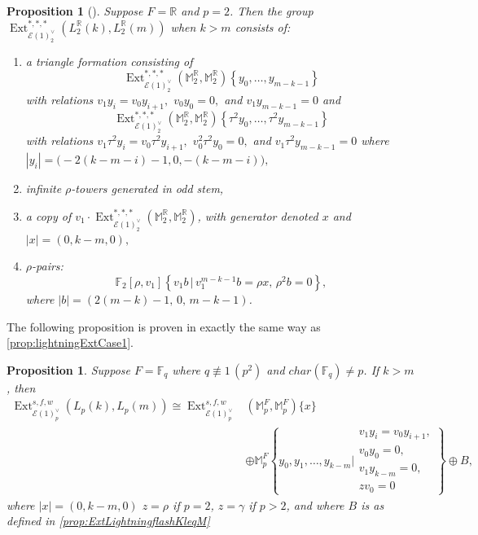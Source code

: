 \documentclass{amsart}
\newtheorem{proposition}[theorem]{Proposition}
\theoremstyle{plain}
\numberwithin{theorem}{section}
\numberwithin{equation}{section}
\numberwithin{figure}{section}
\DeclareMathOperator{\Ext}{Ext}
\newcommand{\mF}{{\mathbb F}}
\newcommand{\mM}{{\mathbb M}}
\newcommand{\mR}{{\mathbb R}}
\newcommand{\cE}{{\mathcal E}}
\newcommand{\0}{\langle 0 \rangle }
\begin{document}
\begin{proposition}[{\cite[Lemma 6.8]{LiPetTat25}}] \label{prop:RmotExtk>m}
    Suppose $F = \mR$ and $p = 2$. Then the group $\Ext_{\cE(1)_2^\vee}^{*,*,*}(L_2^\mathbb{R} (k), L_2^\mathbb{R} (m))$ when $k > m$ consists of: 
\begin{enumerate}
\item a triangle formation consisting of 
\[
\Ext^{*,*,*}_{\cE(1)_2^\vee}\left(\mM^{\mR}_{2}, \mM_2^{\mR} \right) \left\{y_{0}, \ldots, y_{m-k-1} \right\}
\]
with relations $v_{1}y_{i} = v_{0}y_{i+1},$ $v_{0}y_{0} = 0,$ and $v_{1}y_{m-k-1} = 0$ and 
\[
\Ext^{*,*,*}_{\cE(1)_2^\vee}\left(\mM_2^{\mR}, \mM_2^{\mR} \right) \left\{ \tau^{2}y_{0}, \ldots, \tau^{2}y_{m-k-1} \right\}
\]
with relations $v_{1} \tau^{2}y_{i} = v_{0}\tau^{2}y_{i+1},$ $v_{0}^{2}\tau^{2}y_{0} = 0,$ and $v_{1}\tau^2 y_{m-k-1} = 0$ where \newline $|y_{i}| = \big(-2(k-m - i)-1, 0, -(k-m - i)\big),$ 

     \item infinite $\rho$-towers generated in odd stem,

      \item a copy of $v_{1}\cdot\Ext^{*,*,*}_{\cE(1)_2^\vee}(\mM_2^\mR, \mM_2^{\mR})$, with generator denoted $x$ and $|x| = (0, k-m, 0),$

    \item $\rho$-pairs: \[\mF_2 [\rho, v_{1}] \left\{ v_1 b \, | \, v_{1}^{m-k-1}b = \rho x, \, \rho^{2}b = 0\right\}, \] where $|b| = (2(m-k)-1, \, 0, \, m-k-1)$. 
    \end{enumerate}
\end{proposition} 

The following proposition is proven in exactly the same way as \cref{prop:lightningExtCase1}.
\begin{proposition}\label{ExtKLeM:p=2Different}
    Suppose $F = \mF_q$ where $q \not\equiv 1 \, (p^2)$ and $char(\mathbb{F}_{q}) \neq p$. If $k > m$, then
     \begin{align*}
           \Ext_{\cE(1)_p^\vee}^{s,f,w}(L_p(k), L_p(m)) \cong \Ext_{\cE(1)_p^\vee}^{s,f,w} & (\mM^F_{p}, \mM^F_{p})\{x \} \\
           & \oplus \mM^F_{p}\left\{ y_{0}, y_{1}, \ldots, y_{k-m} \Bigg\vert \begin{array}{l}
         v_{1}y_{i} = v_{0}y_{i+1},\\  v_{0}y_{0} = 0,\\
         v_{1}y_{k-m} = 0,\\  z v_0 = 0
    \end{array}\right\} \oplus B,
   \end{align*}
    where $|x| = (0,k-m,0)$ $z=\rho$ if $p=2$, $z= \gamma$ if $p>2$, and where $B$ is as defined in \cref{prop:ExtLightningflashKleqM}
\end{proposition}
\end{document}
